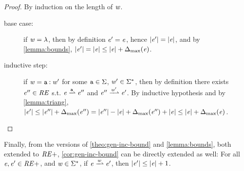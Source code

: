 \begin{proof}
 By induction on the length of $\mathit {w}$.
 \begin{description}
  \item[base case:] if $\mathit {w}=\lambda$, then by definition $\mathit {e}'=\mathit {e}$, hence
   ${\mid}{\mathit {e}'}{\mid}={\mid}{\mathit {e}}{\mid}$, and by \cref{lemma:bounds}, ${\mid}{\mathit {e}'}{\mid}={\mid}{\mathit {e}}{\mid}\leq{\mid}{\ensuremath{\mathit {e}}}{\mid}+{\Delta_{\max}}({\mathit {e}})$.

  \item[inductive step:]
   if $\mathit {w}=\mathtt {a}\mathbin{:}\mathit {w}'$ for some $\mathtt {a}\in\Sigma$, $\mathit {w}'\in\Sigma^*$, then by definition there exists $\mathit {e}''\in\mathit {RE}$ s.t. $\re\parDer{\sym}\re''$ and $\re''\parDer{\word'}\re'$. By inductive hypothesis and by \cref{lemma:triang}, ${\mid}{\mathit {e}'}{\mid}\leq{\mid}{\ensuremath{\mathit {e}}''}{\mid}+{\Delta_{\max}}({\mathit {e}''})={\mid}{\mathit {e}''}{\mid}-{\mid}{\mathit {e}}{\mid}+{\Delta_{\max}}({\mathit {e}''})+{\mid}{\mathit {e}}{\mid}\leq{\mid}{\ensuremath{\mathit {e}}}{\mid}+{\Delta_{\max}}({\mathit {e}})$.

 \end{description}
\end{proof}

Finally, from the versions of \cref{theo:gen-inc-bound} and \cref{lemma:bounds}, both extended to $\mathit {RE+}$, \cref{cor:gen-inc-bound} can be directly extended as well: For all $\mathit {e},\mathit {e}'\in\mathit {RE+}$, and $\mathit {w}\in\Sigma^*$, if $\re\parDer{\word}\re'$, then ${\mid}{\mathit {e}'}{\mid}\leq{\mid}{\ensuremath{\mathit {e}}}{\mid}+1$.
